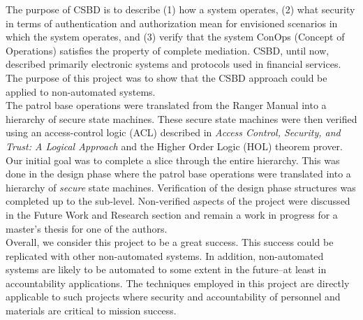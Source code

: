 The purpose of CSBD is to describe (1) how a system operates, (2) what security in terms of authentication and authorization mean for envisioned scenarios in which the system operates, and (3) verify that the system ConOps (Concept of Operations) satisfies the property of complete mediation. CSBD, until now, described primarily electronic systems and protocols used in financial services.  The purpose of this project was to show that the CSBD approach could be applied to non-automated systems.\\

The patrol base operations were translated from the Ranger Manual into a hierarchy of secure state machines.  These secure state machines were then verified using an access-control logic (ACL) described in \emph{Access Control, Security, and Trust: A Logical Approach} \cite{acst} and the Higher Order Logic (HOL) theorem prover.  \\

Our initial goal was to complete a slice through the entire hierarchy.  This was done in the design phase where the patrol base operations were translated into a hierarchy of \emph{secure} state machines.   Verification of the design phase structures was completed up to the sub-level.  Non-verified aspects of the project were discussed in the Future Work and Research section and remain a work in progress for a master's thesis for one of the authors.\\

Overall, we consider this project to be a great success.  This success could be replicated with other non-automated systems.  In addition, non-automated systems are likely to be automated to some extent in the future--at least in accountability applications.  The techniques employed in this project are directly applicable to such projects where security and accountability of personnel and materials are critical to mission success.  \\

